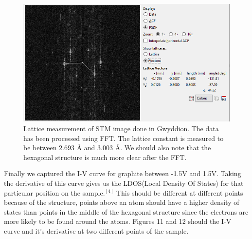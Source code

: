 \documentclass{article}
\begin{document}
\begin{figure}[H]
\includegraphics[scale=.8,center]{STMLatticeFFT.PNG}
\caption{Lattice measurement of STM image done in Gwyddion.  The data has been processed using FFT.  The lattice constant is measured to be between $2.693$ {\AA} and $3.003$ {\AA}.  We should also note that the hexagonal structure is much more clear after the FFT.}
\end{figure}

Finally we captured the I-V curve for graphite between -1.5V and 1.5V.  Taking the derivative of this curve gives us the LDOS(Local Density Of States) for that particular position on the sample.$^{[4]}$  This should be different at different points because of the structure, points above an atom should have a higher density of states than points in the middle of the hexagonal structure since the electrons are more likely to be found around the atoms.  Figures 11 and 12 should the I-V curve and it's derivative at two different points of the sample.
\end{document}
